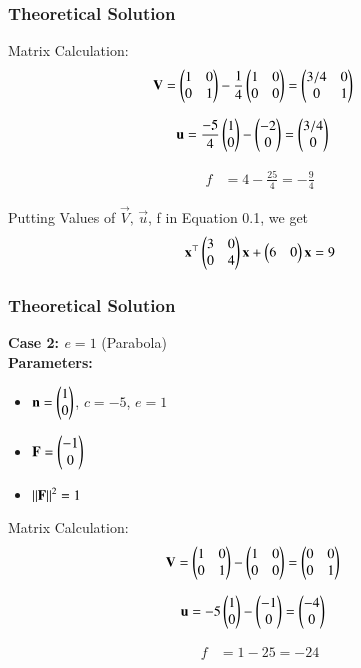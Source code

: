 \documentclass{beamer}
\begin{document}
\begin{frame}[fragile]
    \frametitle{Theoretical Solution}
Matrix Calculation:
\begin{align}
\mathbf{V} &= \begin{pmatrix}1 & 0 \\ 0 & 1\end{pmatrix} - \frac{1}{4}\begin{pmatrix}1 & 0 \\ 0 & 0\end{pmatrix} = \begin{pmatrix}3/4 & 0 \\ 0 & 1\end{pmatrix}
\end{align}

\begin{align}
\mathbf{u} &= \frac{-5}{4}\begin{pmatrix}1 \\ 0\end{pmatrix} - \begin{pmatrix}-2 \\ 0\end{pmatrix} = \begin{pmatrix}3/4 \\ 0\end{pmatrix}
\end{align}

\begin{align}
f &= 4 - \frac{25}{4} = -\frac{9}{4}
\end{align}

Putting Values of $\vec{V}, \, \vec{u}$, f in Equation 0.1, we get
\begin{equation}
\mathbf{x}^\top\begin{pmatrix}3 & 0 \\ 0 & 4\end{pmatrix}\mathbf{x} + \begin{pmatrix}6 & 0\end{pmatrix}\mathbf{x} = 9
\end{equation}

\end{frame}



\begin{frame}[fragile]
    \frametitle{Theoretical Solution}
\textbf{Case 2: $e = 1$} (Parabola)\\
\textbf{Parameters:}
\begin{itemize}
\item $\mathbf{n} = \begin{pmatrix}1 \\ 0\end{pmatrix}$, $c = -5$, $e = 1$
\item $\mathbf{F} = \begin{pmatrix}-1 \\ 0\end{pmatrix}$
\item $\left\lVert\mathbf{F}\right\rVert^2 = 1$
\end{itemize}

Matrix Calculation:
\begin{align}
\mathbf{V} &= \begin{pmatrix}1 & 0 \\ 0 & 1\end{pmatrix} - \begin{pmatrix}1 & 0 \\ 0 & 0\end{pmatrix} = \begin{pmatrix}0 & 0 \\ 0 & 1\end{pmatrix}
\end{align}

\begin{align}
\mathbf{u} &= -5\begin{pmatrix}1 \\ 0\end{pmatrix} - \begin{pmatrix}-1 \\ 0\end{pmatrix} = \begin{pmatrix}-4 \\ 0\end{pmatrix}
\end{align}

\begin{align}
f &= 1 - 25 = -24
\end{align}
\end{frame}
\end{document}
